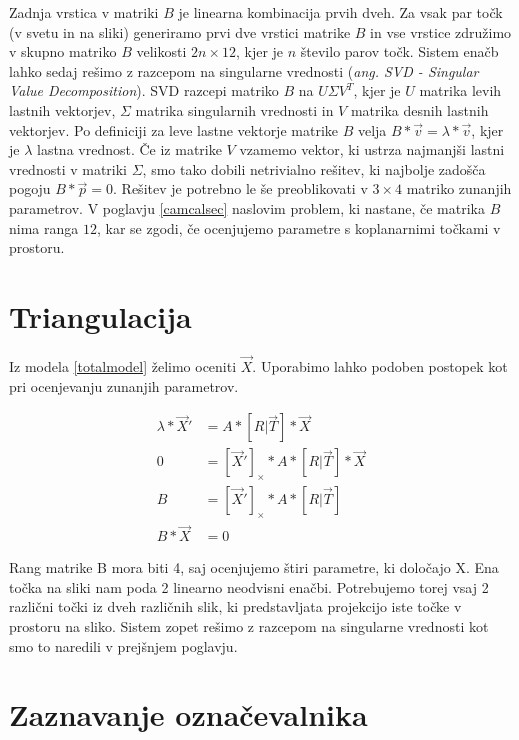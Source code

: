 \documentclass[a4paper, 12pt]{book}
\begin{document}
Zadnja vrstica v matriki $B$ je linearna kombinacija prvih dveh. Za vsak par točk (v svetu in na sliki) generiramo prvi dve vrstici matrike $B$ in vse vrstice združimo v skupno matriko $B$ velikosti $2n \times 12$, kjer je $n$ število parov točk. Sistem enačb lahko sedaj rešimo z razcepom na singularne vrednosti (\emph{ang. SVD - Singular Value Decomposition}). SVD razcepi matriko $B$ na $U \Sigma V^T$, kjer je $U$ matrika levih lastnih vektorjev, $\Sigma$ matrika singularnih vrednosti in $V$ matrika desnih lastnih vektorjev. Po definiciji za leve lastne vektorje matrike $B$ velja $B * \vec{v} = \lambda * \vec{v}$, kjer je $\lambda$ lastna vrednost. Če iz matrike $V$ vzamemo vektor, ki ustrza najmanjši lastni vrednosti v matriki $\Sigma$, smo tako dobili netrivialno rešitev, ki najbolje zadošča pogoju $B * \vec{p} = 0$. Rešitev je potrebno le še preoblikovati v $3 \times 4$ matriko zunanjih parametrov. V poglavju \ref{camcalsec} naslovim problem, ki nastane, če matrika $B$ nima ranga $12$, kar se zgodi, če ocenjujemo parametre s koplanarnimi točkami v prostoru.

\section{Triangulacija}

Iz modela \eqref{totalmodel} želimo oceniti $\vec{X}$. Uporabimo lahko podoben postopek kot pri ocenjevanju zunanjih parametrov.

\begin{align}
\lambda * \vec{X}' &= A * [R | \vec{T}] * \vec{X} \\
0 &= [\vec{X}']_{\times} * A * [R | \vec{T}] * \vec{X} \\
B &= [\vec{X}']_{\times} * A * [R | \vec{T}] \\
B * \vec{X} &= 0
\end{align}

Rang matrike B mora biti 4, saj ocenjujemo štiri parametre, ki določajo X. Ena točka na sliki nam poda 2 linearno neodvisni enačbi. Potrebujemo torej vsaj 2 različni točki iz dveh različnih slik, ki predstavljata projekcijo iste točke v prostoru na sliko. Sistem zopet rešimo z razcepom na singularne vrednosti kot smo to naredili v prejšnjem poglavju.

\section{Zaznavanje označevalnika}\label{markersection}
\end{document}
